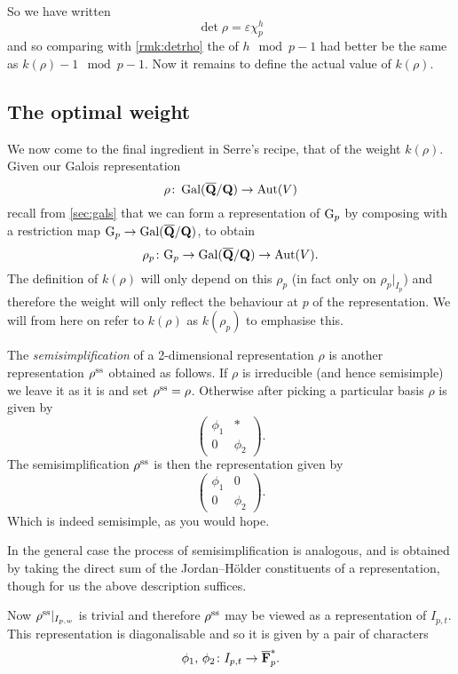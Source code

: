 \documentclass[a4paper,12pt]{article}
\begin{document}
So we have written
\[
\det\rho = \varepsilon \chi_p^h
\]
and so comparing with \cref{rmk:detrho} the of $h \mod{p-1}$ had better be the same as $k(\rho)-1\mod{p-1}$.
Now it remains to define the actual value of $k(\rho)$.



\subsection{The optimal weight}
We now come to the final ingredient in Serre's recipe, that of the weight $k(\rho)$.
Given our Galois representation
\[
\rho \colon \operatorname{Gal}(\overline{\mathbf{Q}}/\mathbf{Q}) \to \operatorname{Aut}(V)
\]
recall from \cref{sec:gals} that we can form a representation of $\mathrm{G}_p$ by composing with a restriction map $\mathrm{G}_p \to\operatorname{Gal}(\overline{\mathbf{Q}}/\mathbf{Q})$, to obtain
\[
\rho_p\colon \mathrm{G}_p \to \operatorname{Gal}(\overline{\mathbf{Q}}/\mathbf{Q}) \to \operatorname{Aut}(V).
\]
The definition of $k(\rho)$ will only depend on this $\rho_p$ (in fact only on $\rho_p|_{I_p}$) and therefore the weight will only reflect the behaviour at $p$ of the representation. %
We will from here on refer to $k(\rho)$ as $k(\rho_p)$ to emphasise this.

\begin{defn}\label{def:semisimp}
The \emph{semisimplification} of a 2-dimensional representation $\rho$ is another representation $\rho^\text{ss}$ obtained as follows.
If $\rho$ is irreducible (and hence semisimple) we leave it as it is and set $\rho^\text{ss} = \rho$.
Otherwise after picking a particular basis $\rho$ is given by
\[
\begin{pmatrix}
\phi_1 & * \\
0      & \phi_2
\end{pmatrix}.
\]
The semisimplification $\rho^\text{ss}$ is then the representation given by
\[
\begin{pmatrix}
\phi_1 & 0 \\
0      & \phi_2
\end{pmatrix}.
\]
Which is indeed semisimple, as you would hope.

In the general case the process of semisimplification is analogous, and is obtained by taking the direct sum of the Jordan--H\"older constituents of a representation, though for us the above description suffices.
\end{defn}

Now $\rho^\text{ss}|_{I_{p,w}}$ is trivial and therefore $\rho^\text{ss}$ may be viewed as a representation of $I_{p,t}$.
This representation is diagonalisable and so it is given by a pair of characters
\[
\phi_1,\,\phi_2\colon I_{p,t} \to \overline{\mathbf{F}}_p^*.
\]
\end{document}
